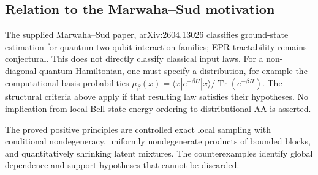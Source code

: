 \subsection{Relation to the Marwaha--Sud
motivation}\label{proof:positive_structure:relation-to-the-marwahasud-motivation}

The supplied \href{https://arxiv.org/abs/2604.13026}{Marwaha--Sud paper,
arXiv:2604.13026} classifies ground-state estimation for quantum
two-qubit interaction families; EPR tractability remains conjectural.
This does not directly classify classical input laws. For a non-diagonal
quantum Hamiltonian, one must specify a distribution, for example the
computational-basis probabilities
\(\mu_\beta(x)=\langle x|e^{-\beta H}|x\rangle/\operatorname{Tr}(e^{-\beta H})\). The
structural criteria above apply if that resulting law satisfies their
hypotheses. No implication from local Bell-state energy ordering to
distributional AA is asserted.

The proved positive principles are controlled exact local sampling with
conditional nondegeneracy, uniformly nondegenerate products of bounded
blocks, and quantitatively shrinking latent mixtures. The
counterexamples identify global dependence and support hypotheses that
cannot be discarded.
